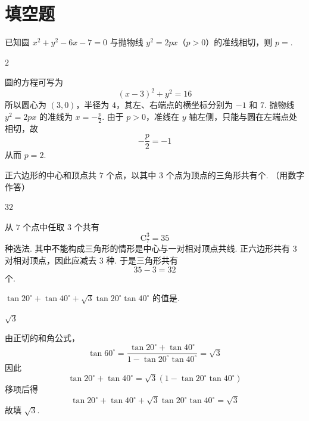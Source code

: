 \section{填空题}

\begin{problem}
已知圆 \(x^{2} + y^{2} - 6x - 7 = 0\) 与抛物线 \(y^{2} = 2px\)（\(p > 0\)）的准线相切，则 \(p =\)\fillinblank{}.
\end{problem}

\begin{answer}
\(2\)
\end{answer}

\begin{solution}
圆的方程可写为
\[
(x-3)^2+y^2=16
\]
所以圆心为 \((3,0)\)，半径为 \(4\)，其左、右端点的横坐标分别为 \(-1\) 和 \(7\). 抛物线 \(y^2=2px\) 的准线为 \(x=-\frac p2\). 由于 \(p>0\)，准线在 \(y\) 轴左侧，只能与圆在左端点处相切，故
\[
-\frac p2=-1
\]
从而 \(p=2\).
\end{solution}

\begin{problem}
正六边形的中心和顶点共 \(7\) 个点，以其中 \(3\) 个点为顶点的三角形共有\fillinblank{}个. （用数字作答）
\end{problem}

\begin{answer}
\(32\)
\end{answer}

\begin{solution}
从 \(7\) 个点中任取 \(3\) 个共有
\[
\mathrm C_7^3=35
\]
种选法. 其中不能构成三角形的情形是中心与一对相对顶点共线. 正六边形共有 \(3\) 对相对顶点，因此应减去 \(3\) 种. 于是三角形共有
\[
35-3=32
\]
个.
\end{solution}

\begin{problem}
\(\tan 20^{\circ} + \tan 40^{\circ} + \sqrt{3}\tan 20^{\circ}\tan 40^{\circ}\) 的值是\fillinblank{}.
\end{problem}

\begin{answer}
\(\sqrt{3}\)
\end{answer}

\begin{solution}
由正切的和角公式，
\[
\tan60^{\circ}
=\frac{\tan20^{\circ}+\tan40^{\circ}}
{1-\tan20^{\circ}\tan40^{\circ}}
=\sqrt3
\]
因此
\[
\tan20^{\circ}+\tan40^{\circ}
=\sqrt3\left(1-\tan20^{\circ}\tan40^{\circ}\right)
\]
移项后得
\[
\tan20^{\circ}+\tan40^{\circ}
+\sqrt3\tan20^{\circ}\tan40^{\circ}=\sqrt3
\]
故填 \(\sqrt3\).
\end{solution}

